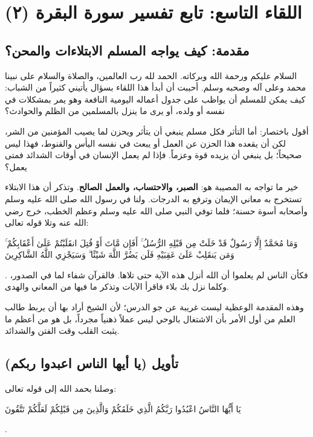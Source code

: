 \chapter{اللقاء التاسع: تابع تفسير سورة البقرة (٢)}

\section{مقدمة: كيف يواجه المسلم الابتلاءات والمحن؟}
السلام عليكم ورحمة الله وبركاته. الحمد لله رب العالمين، والصلاة والسلام على نبينا محمد وعلى آله وصحبه وسلم. 
أحببت أن أبدأ هذا اللقاء بسؤال يأتيني كثيراً من الشباب: كيف يمكن للمسلم أن يواظب على جدول أعماله اليومية النافعة وهو يمر بمشكلات في نفسه أو ولده، أو يرى ما ينزل بالمسلمين من الظلم والحوادث؟

أقول باختصار: أما التأثر فكل مسلم ينبغي أن يتأثر ويحزن لما يصيب المؤمنين من الشر، لكن أن يقعده هذا الحزن عن العمل أو يبعث في نفسه اليأس والقنوط، فهذا ليس صحيحاً؛ بل ينبغي أن يزيده قوة وعزماً. فإذا لم يعمل الإنسان في أوقات الشدائد فمتى يعمل؟ 

خير ما تواجه به المصيبة هو: \textbf{الصبر، والاحتساب، والعمل الصالح}. 
وتذكر أن هذا الابتلاء تستخرج به معاني الإيمان وترفع به الدرجات. ولنا في رسول الله صلى الله عليه وسلم وأصحابه أسوة حسنة؛ فلما توفي النبي صلى الله عليه وسلم وعظم الخطب، خرج  رضي الله عنه وتلا قوله تعالى: \begin{ayah}وَمَا مُحَمَّدٌ إِلَّا رَسُولٌ قَدْ خَلَتْ مِن قَبْلِهِ الرُّسُلُ ۚ أَفَإِن مَّاتَ أَوْ قُتِلَ انقَلَبْتُمْ عَلَىٰ أَعْقَابِكُمْ ۚ وَمَن يَنقَلِبْ عَلَىٰ عَقِبَيْهِ فَلَن يَضُرَّ اللَّهَ شَيْئًا ۗ وَسَيَجْزِي اللَّهُ الشَّاكِرِينَ\end{ayah}. فكأن الناس لم يعلموا أن الله أنزل هذه الآية حتى تلاها. فالقرآن شفاء لما في الصدور، وكلما نزل بك بلاء فاقرأ الآيات وتذكر ما فيها من المعاني والهدى.

وهذه المقدمة الوعظية ليست غريبة عن جو الدرس؛ لأن الشيخ أراد بها أن يربط طالب العلم من أول الأمر بأن الاشتغال بالوحي ليس عملاً ذهنياً مجرداً، بل هو من أعظم ما يثبت القلب وقت الفتن والشدائد.

\separator

\section{تأويل (يا أيها الناس اعبدوا ربكم)}
وصلنا بحمد الله إلى قوله تعالى: \begin{ayah}يَا أَيُّهَا النَّاسُ اعْبُدُوا رَبَّكُمُ الَّذِي خَلَقَكُمْ وَالَّذِينَ مِن قَبْلِكُمْ لَعَلَّكُمْ تَتَّقُونَ\end{ayah}.

